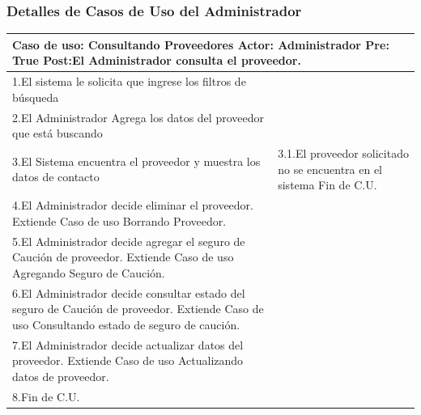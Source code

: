 \subsubsection{Detalles de Casos de Uso del Administrador}
\begin{longtable}{| p{} | p{} |}
    \hline
    \multicolumn{2}{|p{16cm}|}{
        \textbf{Caso de uso:} Consultando Proveedores \newline
        \textbf{Actor:} Administrador\newline
        \textbf{Pre:}  True\newline
        \textbf{Post:}El Administrador consulta el proveedor.
    }\\
    \hline
    1.El sistema le solicita que ingrese los filtros de búsqueda  & \\
    \hline
    2.El Administrador Agrega los datos del proveedor que está buscando& \\
    \hline
    3.El Sistema encuentra el proveedor y muestra los datos de contacto & 3.1.El proveedor solicitado no se encuentra en el sistema \newline 3.2 Fin de C.U.  \\
    \hline
    4.El Administrador decide eliminar el proveedor. Extiende Caso de uso Borrando Proveedor.& \\
    \hline
    5.El Administrador decide agregar el seguro de Caución de proveedor. Extiende Caso de uso Agregando Seguro de Caución.& \\
    \hline
    6.El Administrador decide consultar estado del seguro de Caución de proveedor. Extiende Caso de uso Consultando estado de seguro de caución.& \\
    \hline
    7.El Administrador decide actualizar datos del proveedor. Extiende Caso de uso Actualizando datos de proveedor.& \\
    \hline
    8.Fin de C.U.& \\
    \hline
\end{longtable}


